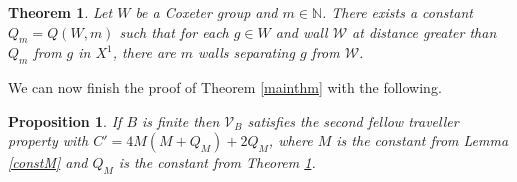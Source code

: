 \documentclass[a4paper,12pt,leqno]{amsart}
\newtheorem{thm}[theorem]{Theorem}
\newtheorem{prop}[theorem]{Proposition}
\theoremstyle{definition}
\newcommand{\N}{\mathbb{N}}
\newcommand{\W}{\mathcal{W}}
\newcommand{\V}{\mathcal{V}}
\begin{document}
\begin{thm} \label{Parallel wall}
    Let $W$ be a Coxeter group and $m \in \N$. There exists a constant $Q_m = Q(W,m)$ such that for each $g \in W$ and wall $\W$ at distance greater than $Q_m$ from $g$ in $X^1$, there are $m$ walls separating $g$ from $\W$.
\end{thm}

We can now finish the proof of Theorem \ref{mainthm} with the following.

\begin{prop} \label{propFTPb}
    If $B$ is finite then $\V_B$ satisfies the second fellow traveller property with $C' = 4M(M+Q_M)+2Q_M$, where $M$ is the constant from Lemma \ref{constM} and $Q_M$ is the constant from Theorem \ref{Parallel wall}.
\end{prop}
\end{document}
